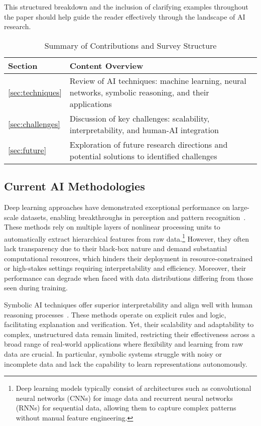 \documentclass[sigconf]{acmart}
\begin{document}
This structured breakdown and the inclusion of clarifying examples throughout the paper should help guide the reader effectively through the landscape of AI research.

\begin{table*}[htbp]
\centering
\caption{Summary of Contributions and Survey Structure}
\label{tab:contributions}
\begin{adjustbox}{max width=\textwidth}
\begin{tabular}{@{}ll@{}}
\toprule
Section & Content Overview \\ \midrule
\ref{sec:techniques} & Review of AI techniques: machine learning, neural networks, symbolic reasoning, and their applications \\
\ref{sec:challenges} & Discussion of key challenges: scalability, interpretability, and human-AI integration \\
\ref{sec:future} & Exploration of future research directions and potential solutions to identified challenges \\ \bottomrule
\end{tabular}
\end{adjustbox}
\end{table*}

\subsection{Current AI Methodologies}

Deep learning approaches have demonstrated exceptional performance on large-scale datasets, enabling breakthroughs in perception and pattern recognition~\cite{liu2021deep}. These methods rely on multiple layers of nonlinear processing units to automatically extract hierarchical features from raw data.\footnote{Deep learning models typically consist of architectures such as convolutional neural networks (CNNs) for image data and recurrent neural networks (RNNs) for sequential data, allowing them to capture complex patterns without manual feature engineering.} However, they often lack transparency due to their black-box nature and demand substantial computational resources, which hinders their deployment in resource-constrained or high-stakes settings requiring interpretability and efficiency. Moreover, their performance can degrade when faced with data distributions differing from those seen during training.

Symbolic AI techniques offer superior interpretability and align well with human reasoning processes~\cite{miller2018symbolic}. These methods operate on explicit rules and logic, facilitating explanation and verification. Yet, their scalability and adaptability to complex, unstructured data remain limited, restricting their effectiveness across a broad range of real-world applications where flexibility and learning from raw data are crucial. In particular, symbolic systems struggle with noisy or incomplete data and lack the capability to learn representations autonomously.
\end{document}
